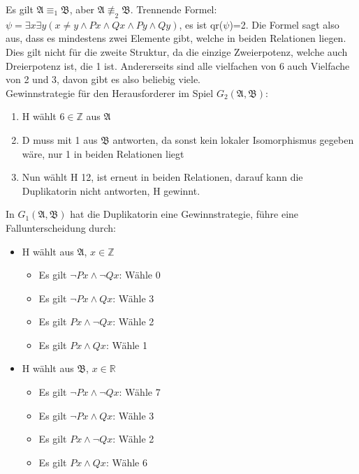 \documentclass[11pt, a4paper]{article}
\newcommand{\struc}[1]{\ensuremath{\mathfrak{#1}}}
\begin{document}
\begin{adjustwidth}{20pt}{20pt}
	Es gilt $\struc{A} \equiv_1 \struc{B}$, aber $\struc{A} \not\equiv_2 \struc{B}$. Trennende Formel: $\psi = \exists x \exists y(x \neq y \wedge Px \wedge Qx \wedge Py \wedge Qy)$, es ist
	qr($\psi$)=2. Die Formel sagt also aus, dass es mindestens zwei Elemente gibt, welche in beiden Relationen liegen. Dies gilt nicht für die zweite Struktur, da die einzige Zweierpotenz,
	welche auch Dreierpotenz ist, die 1 ist. Andererseits sind alle vielfachen von 6 auch Vielfache von 2 und 3, davon gibt es also beliebig viele.\\
	Gewinnstrategie für den Herausforderer im Spiel $G_2(\struc{A},\struc{B})$:
	\begin{enumerate}
	\item H wählt $6\in\mathbb{Z}$ aus \struc{A}
	\item D muss mit 1 aus \struc{B} antworten, da sonst kein lokaler Isomorphismus gegeben wäre, nur 1 in beiden Relationen liegt
	\item Nun wählt H 12, ist erneut in beiden Relationen, darauf kann die Duplikatorin nicht antworten, H gewinnt.
	\end{enumerate}
	In $G_1(\struc{A},\struc{B})$ hat die Duplikatorin eine Gewinnstrategie, führe eine Fallunterscheidung durch:
	\begin{itemize}
	\item H wählt aus \struc{A}, $x \in \mathbb{Z}$
		\begin{itemize}
		\item Es gilt $\neg Px \wedge \neg Qx$: Wähle 0
		\item Es gilt $\neg Px \wedge Qx$: Wähle 3
		\item Es gilt $ Px \wedge \neg Qx$: Wähle 2
		\item Es gilt $ Px \wedge  Qx$: Wähle 1
		\end{itemize}
	\item H wählt aus \struc{B}, $x \in \mathbb{R}$
	\begin{itemize}
		\item Es gilt $\neg Px \wedge \neg Qx$: Wähle 7
		\item Es gilt $\neg Px \wedge Qx$: Wähle 3
		\item Es gilt $ Px \wedge \neg Qx$: Wähle 2
		\item Es gilt $ Px \wedge  Qx$: Wähle 6
	\end{itemize}
	\end{itemize}
\end{adjustwidth}
\end{document}
